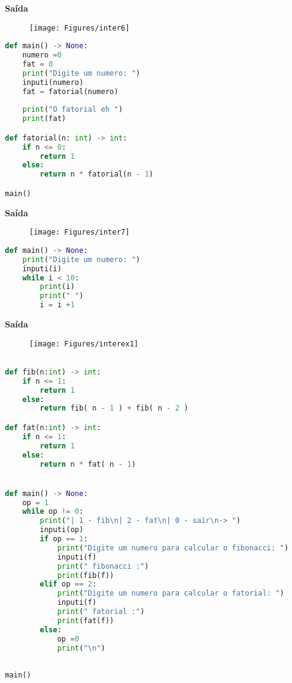\documentclass[hidelinks,12pt]{article}
\begin{document}
\newpage
\textbf{{\large Saída}}

\begin{figure}[!h]
	\centering
	\texttt{[image: Figures/inter6]}
\end{figure}	

\begin{lstlisting}[caption=sintatico.mli, language=python]
def main() -> None:
	numero =0
	fat = 0
	print("Digite um numero: ")
	inputi(numero)
	fat = fatorial(numero)
	
	print("O fatorial eh ")
	print(fat)

def fatorial(n: int) -> int:
	if n <= 0:
		return 1
	else:
		return n * fatorial(n - 1)

main()
\end{lstlisting}

\newpage
\textbf{{\large Saída}}

\begin{figure}[!h]
	\centering
	\texttt{[image: Figures/inter7]}
\end{figure}	


\begin{lstlisting}[caption=sintatico.mli, language=python]
def main() -> None:
	print("Digite um numero: ")
	inputi(i)
	while i < 10:
		print(i)
		print(" ")
		i = i +1

\end{lstlisting}


\textbf{{\large Saída}}

\begin{figure}[!h]
	\centering
	\texttt{[image: Figures/interex1]}
\end{figure}	
	


\begin{lstlisting}[caption=sintatico.mli, language=python]

def fib(n:int) -> int:
	if n <= 1:
		return 1
	else:
		return fib( n - 1 ) + fib( n - 2 )

def fat(n:int) -> int:
	if n <= 1:
		return 1
	else:
		return n * fat( n - 1)


def main() -> None:
	op = 1
	while op != 0:
		print("| 1 - fib\n| 2 - fat\n| 0 - sair\n-> ")
		inputi(op)
		if op == 1:
			print("Digite um numero para calcular o fibonacci: ")
			inputi(f)
			print(" fibonacci :")
			print(fib(f))
		elif op == 2:
			print("Digite um numero para calcular o fatorial: ")
			inputi(f)
			print(" fatorial :")
			print(fat(f))
		else:
			op =0
			print("\n")
			
			
main()
\end{lstlisting}
\end{document}
